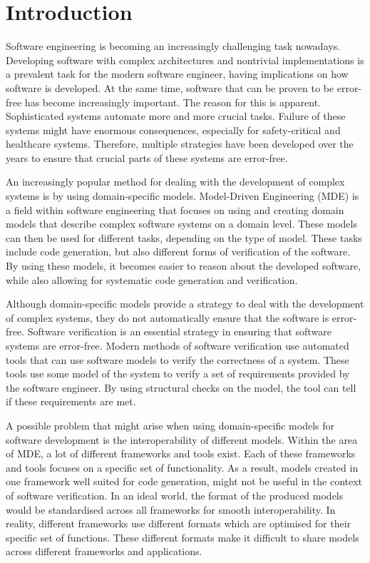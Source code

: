 \chapter{Introduction}
\label{chapter:introduction}
Software engineering is becoming an increasingly challenging task nowadays. Developing software with complex architectures and nontrivial implementations is a prevalent task for the modern software engineer, having implications on how software is developed. At the same time, software that can be proven to be error-free has become increasingly important. The reason for this is apparent. Sophisticated systems automate more and more crucial tasks. Failure of these systems might have enormous consequences, especially for safety-critical and healthcare systems. Therefore, multiple strategies have been developed over the years to ensure that crucial parts of these systems are error-free.

An increasingly popular method for dealing with the development of complex systems is by using domain-specific models. Model-Driven Engineering (MDE) is a field within software engineering that focuses on using and creating domain models that describe complex software systems on a domain level. These models can then be used for different tasks, depending on the type of model. These tasks include code generation, but also different forms of verification of the software. By using these models, it becomes easier to reason about the developed software, while also allowing for systematic code generation and verification.

Although domain-specific models provide a strategy to deal with the development of complex systems, they do not automatically ensure that the software is error-free. Software verification is an essential strategy in ensuring that software systems are error-free. Modern methods of software verification use automated tools that can use software models to verify the correctness of a system. These tools use some model of the system to verify a set of requirements provided by the software engineer. By using structural checks on the model, the tool can tell if these requirements are met.

A possible problem that might arise when using domain-specific models for software development is the interoperability of different models. Within the area of MDE, a lot of different frameworks and tools exist. Each of these frameworks and tools focuses on a specific set of functionality. As a result, models created in one framework well suited for code generation, might not be useful in the context of software verification. In an ideal world, the format of the produced models would be standardised across all frameworks for smooth interoperability. In reality, different frameworks use different formats which are optimised for their specific set of functions. These different formats make it difficult to share models across different frameworks and applications.


